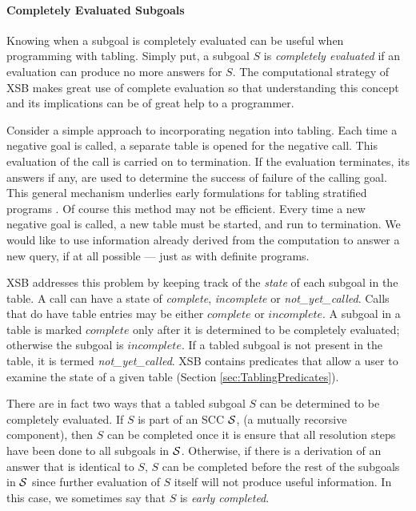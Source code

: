 \paragraph*{Completely Evaluated Subgoals}

Knowing when a subgoal is completely evaluated can be useful when
programming with tabling.  Simply put, a subgoal $S$ is {\em completely
evaluated} if an evaluation can produce no more answers for $S$\@.  The
computational strategy of XSB makes great use of complete evaluation
so that understanding this concept and its implications can be of
great help to a programmer.

Consider a simple approach to incorporating negation into tabling.
Each time a negative goal is called, a separate table is opened for
the negative call.  This evaluation of the call is carried on to
termination.  If the evaluation terminates, its answers if any, are
used to determine the success of failure of the calling goal.  This
general mechanism underlies early formulations for tabling stratified
programs \cite{KeTo88,Seki89}.  Of course this method may not be
efficient.  Every time a new negative goal is called, a new table must
be started, and run to termination.  We would like to use information
already derived from the computation to answer a new query, if at all
possible --- just as with definite programs.

XSB addresses this problem by keeping track of the {\em state} of each
subgoal in the table.  A call can have a state of {\em complete}, {\em
incomplete} or {\em not\_yet\_called}.  
Calls that do have table entries may be either $complete$ or
$incomplete$.  A subgoal in a table is marked $complete$ only after it
is determined to be completely evaluated; otherwise the subgoal is
$incomplete$.  If a tabled subgoal is not present in the table, it is
termed {\em not\_yet\_called}.  XSB contains predicates that allow a
user to examine the state of a given table (Section
\ref{sec:TablingPredicates}).

There are in fact two ways that a tabled subgoal $S$ can be determined
to be completely evaluated.  If $S$ is part of an SCC ${\cal S}$, (a
mutually recorsive component), then $S$ can be completed once it is
ensure that all resolution steps have been done to all subgoals in
${\cal S}$.  Otherwise, if there is a derivation of an answer that is
identical to $S$, $S$ can be completed before the rest of the subgoals
in ${\cal S}$ since further evaluation of $S$ itself will not produce
useful information.  In this case, we sometimes say that $S$ is {\em
  early completed}.

